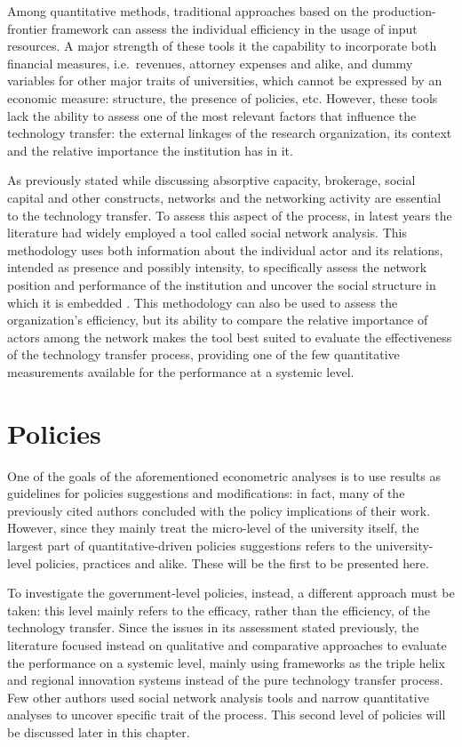 Among quantitative methods, traditional approaches based on the production-frontier framework can assess the individual efficiency in the usage of input resources. A major strength of these tools it the capability to incorporate both financial measures, i.e.\ revenues, attorney expenses and alike, and dummy variables for other major traits of universities, which cannot be expressed by an economic measure: structure, the presence of policies, etc. However, these tools lack the ability to assess one of the most relevant factors that influence the technology transfer: the external linkages of the research organization, its context and the relative importance the institution has in it. 

As previously stated while discussing absorptive capacity, brokerage, social capital and other constructs, networks and the networking activity are essential to the technology transfer. To assess this aspect of the process, in latest years the literature had widely employed a tool called social network analysis. This methodology uses both information about the individual actor and its relations, intended as presence and possibly intensity, to specifically assess the network position and performance of the institution and uncover the social structure in which it is embedded \citep{Pinheiro2015}. This methodology can also be used to assess the organization's efficiency, but its ability to compare the relative importance of actors among the network makes the tool best suited to evaluate the effectiveness of the technology transfer process, providing one of the few quantitative measurements available for the performance at a systemic level.

\section{Policies}

One of the goals of the aforementioned econometric analyses is to use results as guidelines for policies suggestions and modifications: in fact, many of the previously cited authors concluded with the policy implications of their work. However, since they mainly treat the micro-level of the university itself, the largest part of quantitative-driven policies suggestions refers to the university-level policies, practices and alike. These will be the first to be presented here.

To investigate the government-level policies, instead, a different approach must be taken: this level mainly refers to the efficacy, rather than the efficiency, of the technology transfer. Since the issues in its assessment stated previously, the literature focused instead on qualitative and comparative approaches to evaluate the performance on a systemic level, mainly using frameworks as the triple helix and regional innovation systems instead of the pure technology transfer process. Few other authors used social network analysis tools and narrow quantitative analyses to uncover specific trait of the process. This second level of policies will be discussed later in this chapter.

